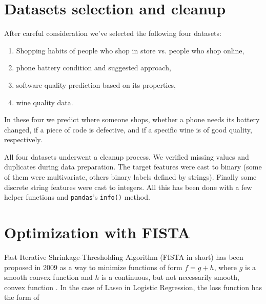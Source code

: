 \documentclass{article}
\begin{document}

\section{Datasets selection and cleanup}

After careful consideration we've selected the following four datasets:

\begin{enumerate}
    \item Shopping habits of people who shop in store vs. people who shop online,
    \item phone battery condition and suggested approach,
    \item software quality prediction based on its properties,
    \item wine quality data.
\end{enumerate}

In these four we predict where someone shops, whether a phone needs its battery changed, if a piece of code is defective, and if a specific wine is of good quality, respectively.

All four datasets underwent a cleanup process. We verified missing values and duplicates during data preparation. The target features were cast to binary (some of them were multivariate, others binary labels defined by strings). Finally some discrete string features were cast to integers. All this has been done with a few helper functions and \verb|pandas|'s \verb|info()| method.

\section{Optimization with FISTA}


Fast Iterative Shrinkage-Thresholding Algorithm (FISTA in short) has been proposed in 2009 as a way to minimize functions of form $f = g + h$, where $g$ is a smooth convex function and $h$ is a continuous, but not necessarily smooth, convex function \cite{fista}. In the case of Lasso in Logistic Regression, the loss function has the form of
\end{document}
